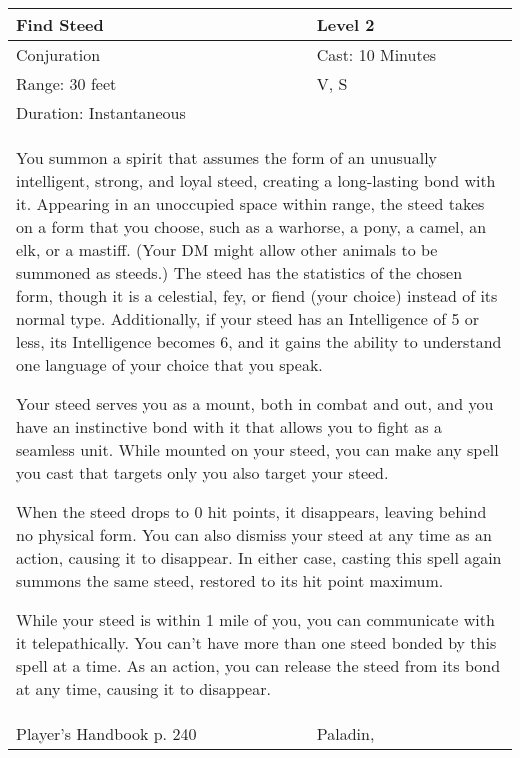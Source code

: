 \documentclass[11pt]{report}
\begin{document}
\begin{table}[H]
	\begin{tabular}{||p{6cm}|p{6cm}||}
		\hline\hline
		\bf{Find Steed} & Level 2\\ \hline
		Conjuration & Cast: 10 Minutes\\ \hline
		Range: 30 feet & V, S\\ \hline
		Duration: Instantaneous & \\ \hline
		\multicolumn{2}{||p{12cm}||}{You summon a spirit that assumes the form of an unusually intelligent, strong, and loyal steed, creating a long-lasting bond with it. Appearing in an unoccupied space within range, the steed takes on a form that you choose, such as a warhorse, a pony, a camel, an elk, or a mastiff. (Your DM might allow other animals to be summoned as steeds.) The steed has the statistics of the chosen form, though it is a celestial, fey, or fiend (your choice) instead of its normal type. Additionally, if your steed has an Intelligence of 5 or less, its Intelligence becomes 6, and it gains the ability to understand one language of your choice that you speak.

Your steed serves you as a mount, both in combat and out, and you have an instinctive bond with it that allows you to fight as a seamless unit. While mounted on your steed, you can make any spell you cast that targets only you also target your steed.

When the steed drops to 0 hit points, it disappears, leaving behind no physical form. You can also dismiss your steed at any time as an action, causing it to disappear. In either case, casting this spell again summons the same steed, restored to its hit point maximum.

While your steed is within 1 mile of you, you can communicate with it telepathically. You can’t have more than one steed bonded by this spell at a time. As an action, you can release the steed from its bond at any time, causing it to disappear.}\\ \hline
Player's Handbook p. 240 & Paladin, \\ \hline\hline
	\end{tabular}
\end{table}
\end{document}
